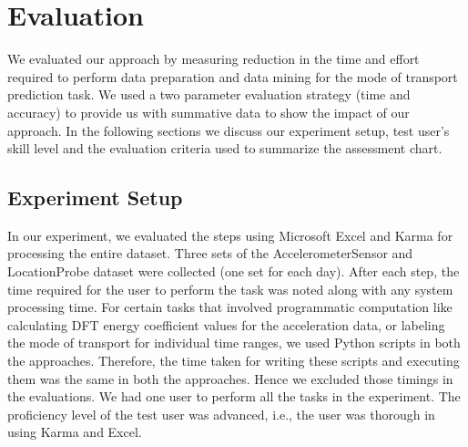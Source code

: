\section{Evaluation}
We evaluated our approach by measuring reduction in the time and effort required to perform data preparation and data mining for the mode of transport prediction task. We used a two parameter evaluation strategy (time and accuracy) to provide us with summative data to show the impact of our approach. In the following sections we discuss our experiment setup, test user's skill level and the evaluation criteria used to summarize the assessment chart. 

\subsection{Experiment Setup}
In our experiment, we evaluated the steps using Microsoft Excel and Karma for processing the entire dataset. Three sets of the AccelerometerSensor and LocationProbe dataset were collected (one set for each day).  After each step, the time required for the user to perform the task was noted along with any system processing time. For certain tasks that involved programmatic computation like calculating DFT energy coefficient values for the acceleration data, or labeling the mode of transport for individual time ranges, we used Python scripts in both the approaches. Therefore, the time taken for writing these scripts and executing them was the same in both the approaches. Hence we excluded those timings in the evaluations. We had one user to perform all the tasks in the experiment. The proficiency level of the test user was advanced, i.e., the user was thorough in using Karma and Excel. 

